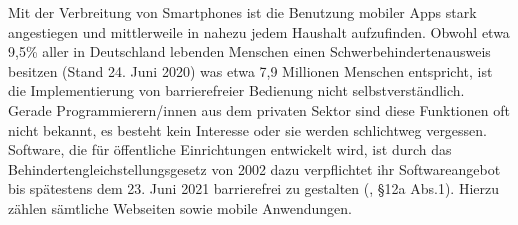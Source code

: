 Mit der Verbreitung von Smartphones ist die Benutzung mobiler Apps stark angestiegen und mittlerweile in nahezu jedem Haushalt aufzufinden. Obwohl etwa 9,5\% aller in Deutschland lebenden Menschen einen Schwerbehindertenausweis besitzen (Stand 24. Juni 2020)\cite{schwerbehindertenausweis} was etwa 7,9 Millionen Menschen entspricht, ist die Implementierung von barrierefreier Bedienung nicht selbstverständlich. Gerade Programmierern/innen aus dem privaten Sektor sind diese Funktionen oft nicht bekannt, es besteht kein Interesse oder sie werden schlichtweg vergessen. Software, die für öffentliche Einrichtungen entwickelt wird, ist durch das Behindertengleichstellungsgesetz von 2002 dazu verpflichtet ihr Softwareangebot bis spätestens dem 23. Juni 2021 barrierefrei zu gestalten (\cite{behindertengleichstellungsgesetz}, §12a Abs.1). Hierzu zählen sämtliche Webseiten sowie mobile Anwendungen. \\
